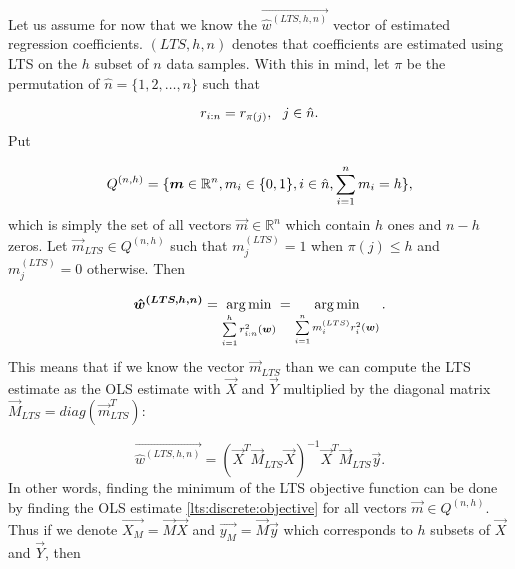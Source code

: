 Let us assume for now that we know the $\vec{\hat{w}^{(LTS, h, n)}}$ vector of estimated regression coefficients. $(LTS, h, n)$ denotes that coefficients are estimated using LTS on the $h$ subset of $n$ data samples. 
With this in mind, let $\pi$ be the permutation of $\hat{n} = \{{1,2,\ldots, n\}}$ such that 

\begin{equation}
    r_{i:n} = r_{\pi(j)}\\, \ \ j \in \hat{n}.
\end{equation}
Put

 \begin{equation}
   Q^{(n,h)} = \{{\vec{m} \in \mathbb{R}^n \\, m_i \in \{{0, 1\}} \\,i \in \hat{n} \\,   \sum\limits_{i=1}^n  m_i = h \}},
\end{equation}
which is simply the set of all vectors $\vec{m} \in \mathbb{R}^n$ which contain $h$ ones and $n-h$ zeros. Let $\vec{m}_{LTS} \in Q^{(n,h)}$  such that  $m^{(LTS)}_j = 1$ when $\pi(j) \leq h$ and $m^{(LTS)}_j = 0$ otherwise. Then

\begin{equation} \label{ltshat}
    \vec{\hat{w}^{(LTS, h, n)}} =  
  \argmin_{ \sum\limits_{i=1}^h r_{i:n}^2(\vec{w}) } = 
  \argmin_{ \sum\limits_{i=1}^n m^{(LTS)}_i r_{i}^2(\vec{w}) }. 
\end{equation}
This means that if we know the vector $\vec{m}_{LTS}$ than we can compute the LTS estimate as the OLS estimate with $\vec{X}$ and $\vec{Y}$ multiplied by the diagonal matrix $\vec{M}_{LTS} = diag(\vec{m}^T_{LTS})$:

\begin{equation}  \label{lts:discrete:objective}
    \vec{\hat{w}^{(LTS, h, n)}} = (\vec{X}^T\vec{M}_{LTS}\vec{X})^{-1}\vec{X}^T\vec{M}_{LTS}\vec{y}.
\end{equation}
In other words, finding the minimum of the LTS objective function can be done by finding the OLS estimate \eqref{lts:discrete:objective} for all vectors 
$\vec{m} \in Q^{(n,h)}$. 
Thus if we denote $\vec{X_{M}} = \vec{M}\vec{X} $ and $\vec{y_{M}} = \vec{M}\vec{y}$ which corresponds to $h$ subsets  of $\vec{X}$ and $\vec{Y}$, then \cite{kloudaVyzkumnyUkol}





